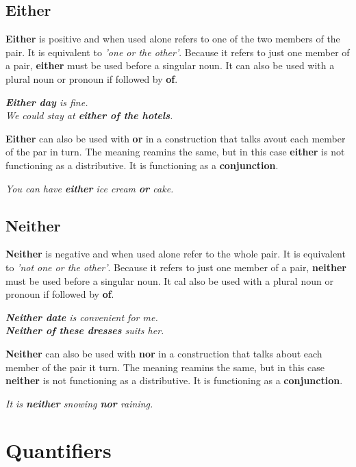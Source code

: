 \documentclass[10pt,a4paper]{article}
\begin{document}
\newpage
\subsection{Either}
\textbf{Either} is positive and when used alone refers to one of the two members of the pair. It is equivalent to \textit{'one or the other'}. Because it refers to just one member of a pair, \textbf{either} must be used before a singular noun. It can also be used with a plural noun or pronoun if followed by \textbf{of}.
\begin{center}
		\textit{ \textbf{Either day} is fine.\\
		We could stay at \textbf{either of the hotels}.}
\end{center}
\textbf{Either} can also be used with \textbf{or} in a construction that talks avout each member of the par in turn. The meaning reamins the same, but in this case \textbf{either} is not functioning as a distributive. It is functioning as a \textbf{conjunction}.
\begin{center}
\textit{ You can have \textbf{either} ice cream \textbf{or} cake.}
\end{center}

\subsection{Neither}
\textbf{Neither} is negative and when used alone refer to the whole pair. It is equivalent to \textit{'not one or the other'}. Because it refers to just one member of a pair, \textbf{neither} must be used before a singular noun. It cal also be used with a plural noun or pronoun if followed by \textbf{of}.
\begin{center}
\textit{ \textbf{Neither date} is convenient for me.\\
\textbf{Neither of these dresses} suits her.}
\end{center}
\textbf{Neither} can also be used with \textbf{nor} in a construction that talks about each member of the pair it turn. The meaning reamins the same, but in this case \textbf{neither} is not functioning as a distributive. It is functioning as a \textbf{conjunction}.
\begin{center}
\textit{ It is \textbf{neither} snowing \textbf{nor} raining.}
\end{center}

\section{Quantifiers}
\end{document}
